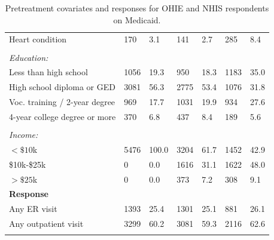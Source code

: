 \documentclass[12pt]{article}
\begin{document}
\begin{appendices}
\begin{singlespace}
\begin{longtable}{lllllll}
\hspace{3mm}Heart condition & 170 & 3.1 & 141 & 2.7 & 285 & 8.4 \\ 
 &  & & &  &  & \\ 
\textit{Education:} &  & & &  &  & \\  
\hspace{3mm}Less than high school  & 1056 & 19.3 & 950 & 18.3 & 1183 & 35.0  \\ 
  
\hspace{3mm}High school diploma or GED & 3081 & 56.3 & 2775 & 53.4 & 1076 & 31.8  \\ 

\hspace{3mm}Voc. training / 2-year degree & 969 & 17.7 & 1031 & 19.9 & 934 & 27.6 \\ 

\hspace{3mm}4-year college degree or more & 370 & 6.8 & 437 & 8.4 & 189 & 5.6 \\ 
 &  & & &  &  & \\ 
\textit{Income:} &  & & &  &  & \\ 
\hspace{3mm} $<\$10$k & 5476 & 100.0 & 3204 & 61.7 & 1452 & 42.9 \\

\hspace{3mm} \$10k-\$25k & 0 & 0.0 & 1616 & 31.1 & 1622 & 48.0 \\

\hspace{3mm} $>\$25$k & 0 & 0.0 & 373 & 7.2 & 308 & 9.1 \\
   \hline
\hline
 \textbf{Response} &   &  &  & &  &  \\ 
\hspace{3mm}Any ER visit &  1393 & 25.4 & 1301 & 25.1 & 881 & 26.1 \\ 
\hspace{3mm}Any outpatient visit & 3299 & 60.2 & 3081 & 59.3 & 2116 & 62.6 \\ 
\hline
\hline
\caption{Pretreatment covariates and responses for OHIE and NHIS respondents on Medicaid.} 
\label{rct-nrt-compare}
\end{longtable}
\end{singlespace}


\end{appendices}
\end{document}
